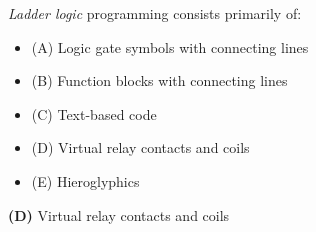 

{\it Ladder logic} programming consists primarily of:

\begin{itemize}
\item{(A)} Logic gate symbols with connecting lines
\vskip 5pt 
\item{(B)} Function blocks with connecting lines
\vskip 5pt 
\item{(C)} Text-based code
\vskip 5pt 
\item{(D)} Virtual relay contacts and coils
\vskip 5pt 
\item{(E)} Hieroglyphics
\end{itemize}







{\bf (D)} Virtual relay contacts and coils
 










